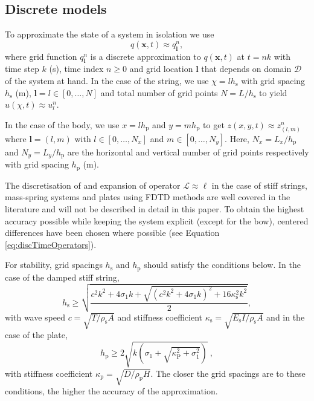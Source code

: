\documentclass[dvipsnames, pdftex]{article}
\def\SBcomment[#1]{\textcolor{Red}{#1}}
\def\stringx{\chi}
\def\ugen{q}
\def\us{u}
\def\um{w}
\def\up{z}
\begin{document}
\subsection{Discrete models}
To approximate the state of a system in isolation we use
\begin{equation}\label{eq:generalDisc}
    \ugen(\boldsymbol{x},t) \approx \ugen^n_{\boldsymbol{l}}, 
\end{equation} 
where grid function $\ugen^n_{\boldsymbol{l}}$ is a discrete approximation to $\ugen({\boldsymbol{x}},t)$ at $t=nk$ with time step $k$ (s), time index $n\geq 0$ and grid location $\boldsymbol{l}$ that depends on domain $\mathcal{D}$ of the system at hand. In the case of the string, we use $\stringx=lh_\text{s}$ with grid spacing $h_\text{s}$ (m), $\boldsymbol{l} = l \in [0,\hdots, N]$ and total number of grid points $N=L/h_\text{s}$ to yield $\us(\stringx,t) \approx \us_l^n$.
% 

In the case of the body, we use $x=lh_\text{p}$ and $y=mh_\text{p}$ to get $\up(x, y, t) \approx \up_{(l,m)}^n$ where $\boldsymbol{l} = (l,m)$ with $l\in[0,\hdots,N_x]$ and $m\in[0,\hdots,N_y]$. Here, $N_x = L_x / h_\text{p}$ and $N_y = L_y / h_\text{p}$ are the horizontal and vertical number of grid points respectively with grid spacing $h_\text{p}$ (m).

 
The discretisation of and expansion of operator $\mathcal{L}\approx \ell$ in the case of stiff strings, mass-spring systems and plates using FDTD methods are well covered in the literature \cite{bilbao2009numerical} and will not be described in detail in this paper. To obtain the highest accuracy possible while keeping the system explicit (except for the bow), centered differences have been chosen where possible (see Equation \eqref{eq:discTimeOperators}). 

For stability, grid spacings $h_\text{s}$ and $h_\text{p}$ should satisfy the conditions below. In the case of the damped stiff string,
\begin{equation}
    h_\text{s} \geq \sqrt{\frac{c^2k^2+4\sigma_1k+\sqrt{(c^2k^2+4\sigma_1k)^2+16\kappa_\text{s}^2k^2}}{2}},
\end{equation}
with wave speed $c = \sqrt{T/\rho_\text{s}A}$ and stiffness coefficient $\kappa_\text{s} = \sqrt{E_\text{s}I/\rho_\text{s}A}$ and in the case of the plate,
\begin{equation}\label{eq:gridSpacingPlate}
    h_\text{p} \geq 2\sqrt{k\left(\sigma_1 + \sqrt{\kappa_\text{P}^2 + \sigma_1^2}\right)}\ ,
\end{equation}
with stiffness coefficient $\kappa_\text{p} = \sqrt{D/\rho_\text{p}H}$. The closer the grid spacings are to these conditions, the higher the accuracy of the approximation. 
\end{document}
